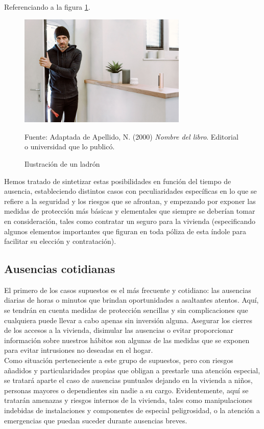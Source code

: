 Referenciando a la figura \ref{fig:ejemplo}.
\begin{figure}[H]
    \begin{center}
        \includegraphics[width=8cm]{img/capitulo_3/intruso.jpg}
    \end{center}
    \caption{Ilustración de un ladrón}
    Fuente: Adaptada de Apellido, N. (2000) \textit{Nombre del libro}.
    Editorial o universidad que lo publicó.
    \label{fig:ejemplo}
\end{figure}
 
Hemos tratado de sintetizar estas posibilidades en función del tiempo de ausencia, estableciendo distintos casos con peculiaridades específicas en lo que se refiere a la seguridad y los riesgos que se afrontan, y empezando por exponer las medidas de protección más básicas y elementales que siempre se deberían tomar en consideración, tales como contratar un seguro para la vivienda (especificando algunos elementos importantes que figuran en toda póliza de esta índole para facilitar su elección y contratación).\\

\subsection{Ausencias cotidianas}
El primero de los casos supuestos es el más frecuente y cotidiano: las ausencias diarias de horas o minutos que brindan oportunidades a asaltantes atentos. Aquí, se tendrán en cuenta medidas de protección sencillas y sin complicaciones que cualquiera puede llevar a cabo apenas sin inversión alguna. Asegurar los cierres de los accesos a la vivienda, disimular las ausencias o evitar proporcionar información sobre nuestros hábitos son algunas de las medidas que se exponen para evitar intrusiones no deseadas en el hogar.\\
 
Como situación perteneciente a este grupo de supuestos, pero con riesgos añadidos y particularidades propias que obligan a prestarle una atención especial, se tratará aparte el caso de ausencias puntuales dejando en la vivienda a niños, personas mayores o dependientes sin nadie a su cargo. Evidentemente, aquí se tratarán amenazas y riesgos internos de la vivienda, tales como manipulaciones indebidas de instalaciones y componentes de especial peligrosidad, o la atención a emergencias que puedan suceder durante ausencias breves.\\


